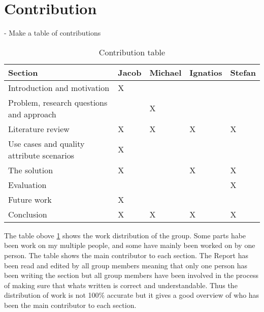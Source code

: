 \documentclass[conference]{IEEEtran}
\begin{document}
\maketitle
\IEEEpubidadjcol


\section{Contribution}

- Make a table of contributions



\begin{table}[h]
    \begin{tabular}{|l|l|l|l|l|}
        \hline
        \textbf{Section}                          & Jacob & Michael & Ignatios & Stefan \\
        \hline
        Introduction and motivation               & X     &         &          &        \\
        \hline
        Problem, research questions and approach  &       & X       &          &        \\
        \hline
        Literature review                         & X     & X       & X        & X      \\
        \hline
        Use cases and quality attribute scenarios & X     &         &          &        \\
        \hline
        The solution                              & X     &         & X        & X      \\
        \hline
        Evaluation                                &       &         &          & X      \\
        \hline
        Future work                               & X     &         &          &        \\
        \hline
        Conclusion                                & X     & X       & X        & X      \\
        \hline
    \end{tabular}
    \caption{Contribution table}
    \label{tab:contribution-table}
\end{table}

The table obove \ref{tab:contribution-table} shows the work distribution of the group. Some parts habe been work on my multiple people, and some have mainly been worked on by one person. The table shows the main contributor to each section. The Report has been read and edited by all group members meaning that only one person has been writing the section but all group members have been involved in the process of making sure that whats written is correct and understandable. Thus the distribution of work is not 100\% accurate but it gives a good overview of who has been the main contributor to each section.
\end{document}
